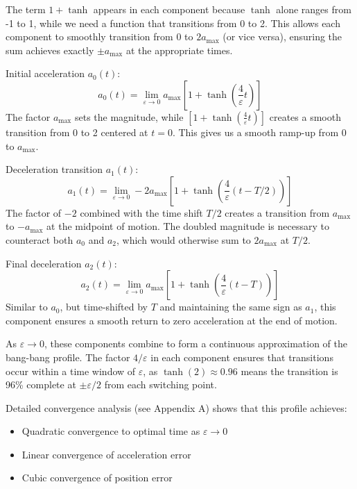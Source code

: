 \documentclass[12pt,a4paper]{article}
\begin{document}
The term $1 + \tanh$ appears in each component because $\tanh$ alone ranges from -1 to 1, while we need a function that transitions from 0 to 2. This allows each component to smoothly transition from 0 to $2a_{\text{max}}$ (or vice versa), ensuring the sum achieves exactly $\pm a_{\text{max}}$ at the appropriate times.

Initial acceleration $a_0(t)$:
\begin{equation}
a_0(t) = \lim_{\varepsilon \to 0} a_{\text{max}}[1 + \tanh(\frac{4}{\varepsilon}t)]
\end{equation}
The factor $a_{\text{max}}$ sets the magnitude, while $[1 + \tanh(\frac{4}{\varepsilon}t)]$ creates a smooth transition from 0 to 2 centered at $t=0$. This gives us a smooth ramp-up from 0 to $a_{\text{max}}$.

Deceleration transition $a_1(t)$:
\begin{equation}
a_1(t) = \lim_{\varepsilon \to 0} -2a_{\text{max}}[1 + \tanh(\frac{4}{\varepsilon}(t-T/2))]
\end{equation}
The factor of $-2$ combined with the time shift $T/2$ creates a transition from $a_{\text{max}}$ to $-a_{\text{max}}$ at the midpoint of motion. The doubled magnitude is necessary to counteract both $a_0$ and $a_2$, which would otherwise sum to $2a_{\text{max}}$ at $T/2$.

Final deceleration $a_2(t)$:
\begin{equation}
a_2(t) = \lim_{\varepsilon \to 0} a_{\text{max}}[1 + \tanh(\frac{4}{\varepsilon}(t-T))]
\end{equation}
Similar to $a_0$, but time-shifted by $T$ and maintaining the same sign as $a_1$, this component ensures a smooth return to zero acceleration at the end of motion.

As $\varepsilon \to 0$, these components combine to form a continuous approximation of the bang-bang profile. The factor $4/\varepsilon$ in each component ensures that transitions occur within a time window of $\varepsilon$, as $\tanh(2) \approx 0.96$ means the transition is 96\% complete at $\pm\varepsilon/2$ from each switching point.

Detailed convergence analysis (see Appendix A) shows that this profile achieves:
\begin{itemize}
\item Quadratic convergence to optimal time as $\varepsilon \to 0$
\item Linear convergence of acceleration error
\item Cubic convergence of position error
\end{itemize}
\end{document}
